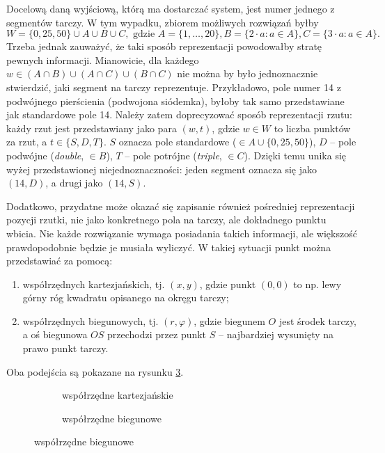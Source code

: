 Docelową daną wyjściową, którą ma dostarczać system, jest numer jednego z segmentów tarczy. W tym wypadku, zbiorem możliwych rozwiązań byłby \[W = \{0, 25, 50\} \cup A \cup B \cup C, \textrm{ gdzie } A = \{1, \ldots, 20 \}, B = \{2 \cdot a : a \in A \}, C = \{3 \cdot a : a \in A \}.\] Trzeba jednak zauważyć, że taki sposób reprezentacji powodowałby stratę pewnych informacji. Mianowicie, dla każdego $w \in (A \cap B) \cup (A \cap C) \cup (B \cap C)$  nie można by było jednoznacznie stwierdzić, jaki segment na tarczy reprezentuje. Przykładowo, pole numer 14 z podwójnego pierścienia (podwojona siódemka), byłoby tak samo przedstawiane jak standardowe pole 14. Należy zatem doprecyzować sposób reprezentacji rzutu: każdy rzut jest przedstawiany jako para $(w, t)$, gdzie $w \in W$ to liczba punktów za rzut, a $t \in \{ S, D, T \}$. $S$ oznacza pole standardowe ($\in A \cup \{0, 25, 50\}$), $D$ -- pole podwójne (\textit{double}, $\in B$), $T$ -- pole potrójne (\textit{triple}, $\in C$). Dzięki temu unika się wyżej przedstawionej niejednoznaczności: jeden segment oznacza się jako $(14, D)$, a drugi jako $(14, S)$.

Dodatkowo, przydatne może okazać się zapisanie również pośredniej reprezentacji pozycji rzutki, nie jako konkretnego pola na tarczy, ale dokładnego punktu wbicia. Nie każde rozwiązanie wymaga posiadania takich informacji, ale większość prawdopodobnie będzie je musiała wyliczyć. W takiej sytuacji punkt można przedstawiać za pomocą:
\begin{enumerate}[label=(\alph*)]
	\item współrzędnych kartezjańskich, tj. $(x, y)$, gdzie punkt $(0, 0)$ to np. lewy górny róg kwadratu opisanego na okręgu tarczy;
	\item współrzędnych biegunowych, tj. $(r, \varphi)$, gdzie biegunem $O$ jest środek tarczy, a oś biegunowa $OS$ przechodzi przez punkt $S$ -- najbardziej wysunięty na prawo punkt tarczy.
\end{enumerate}
Oba podejścia są pokazane na rysunku \ref{tarcza_polozenie}.

\begin{figure}[h!]
\centering
\begin{subfigure}{.5\textwidth}
  \centering
  
  \caption{współrzędne kartezjańskie}
  \label{tarcza_kartezjanskie}
\end{subfigure}%
\begin{subfigure}{.5\textwidth}
  \centering
  
  \caption{współrzędne biegunowe}
  \label{tarcza_biegunowe}
\end{subfigure}
\label{tarcza_polozenie}
\end{figure}

